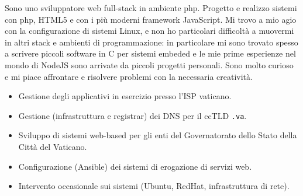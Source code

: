 \documentclass[10pt,a4paper]{altacv}
\begin{document}

\begin{fullwidth}
\makecvheader
\end{fullwidth}

Sono uno sviluppatore web full-stack in ambiente php. Progetto e realizzo sistemi con php, HTML5 e con i più moderni framework JavaScript. Mi trovo a mio agio con la configurazione di sistemi Linux, e non ho particolari difficoltà a muovermi in altri stack e ambienti di programmazione: in particolare mi sono trovato spesso a scrivere piccoli software in C per sistemi embeded e le mie prime esperienze nel mondo di NodeJS sono arrivate da piccoli progetti personali. Sono molto curioso e mi piace affrontare e risolvere problemi con la necessaria creatività.


\begin{itemize}
\item Gestione degli applicativi in esercizio presso l'ISP vaticano.
\item Gestione (infrastruttura e registrar) dei DNS per il ccTLD \texttt{.va}.
\item Sviluppo di sistemi web-based per gli enti del Governatorato dello Stato della Città del Vaticano.
\item Configurazione (Ansible) dei sistemi di erogazione di servizi web.
\item Intervento occasionale sui sistemi (Ubuntu, RedHat, infrastruttura di rete).
\end{itemize}

\divider
\end{document}
